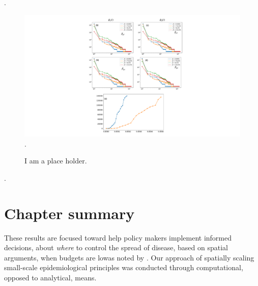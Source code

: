 \blindtext. %

\begin{figure}
    \centering
    \includegraphics[scale=0.55]{chapter6/figures/fig6-cluster-size-distribution.pdf}. %
    \caption{I am a place holder.}
    \label{fig:my_label}
\end{figure}


\blindtext %

\blindtext. %






\section{Chapter summary}


These results are focused toward help policy makers implement informed decisions, about \textit{where} to control the spread of disease, based on spatial arguments, when budgets are low\textemdash as noted by \cite{time-varying-infectivity}. Our approach of spatially scaling small-scale epidemiological principles was conducted through computational, opposed to analytical, means. 

